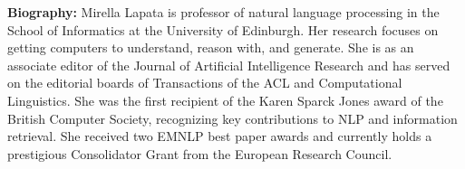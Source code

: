 \noindent
{\bfseries Biography:} Mirella Lapata is professor of natural language processing in the School of Informatics at the University of Edinburgh. Her research focuses on getting computers to understand, reason with, and generate. She is as an associate editor of the Journal of Artificial Intelligence Research and has served on the editorial boards of Transactions of the ACL and Computational Linguistics. She was the first recipient of the Karen Sparck Jones award of the British Computer Society, recognizing key contributions to NLP and information retrieval. She received two EMNLP best paper awards and currently holds a prestigious Consolidator Grant from the European Research Council.

\newpage
